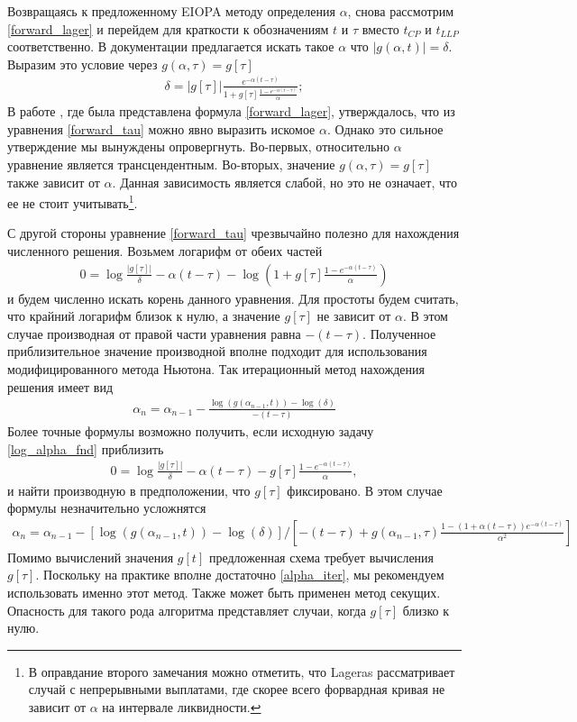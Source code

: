 \documentclass[10pt]{article}
\theoremstyle{definition}
\theoremstyle{remark}
\theoremstyle{plain}
\begin{document}
Возвращаясь к предложенному EIOPA методу определения $\alpha$, снова рассмотрим \eqref{forward_lager} и перейдем для краткости к обозначениям $t$ и $\tau$ вместо $t_{CP}$ и $t_{LLP}$ соответственно.  В документации предлагается искать такое $\alpha$ что $|g(\alpha,t)| = \delta$. Выразим это условие через $g(\alpha,\tau) = g[\tau]$
\begin{align}
\delta = |g[\tau]|\frac{e^{-\alpha(t-\tau)}}{1+g[\tau]\frac{1 - e^{-\alpha(t-\tau)}}{\alpha}}; \label{forward_tau}
\end{align} 
В работе \cite{Lager}, где была представлена формула \eqref{forward_lager}, утверждалось, что из уравнения \eqref{forward_tau} можно явно выразить искомое $\alpha$. Однако это сильное утверждение мы вынуждены опровергнуть. Во-первых, относительно $\alpha$ уравнение является трансцендентным. Во-вторых, значение $g(\alpha,\tau) = g[\tau]$ также зависит от $\alpha$. Данная зависимость является слабой, но это не означает, что ее не стоит учитывать\footnote{В оправдание второго замечания можно отметить, что Lageras рассматривает случай с непрерывными выплатами, где скорее всего форвардная кривая не зависит от $\alpha$ на интервале ликвидности.}. 

С другой стороны уравнение \eqref{forward_tau} чрезвычайно полезно для нахождения численного решения. 
Возьмем логарифм от обеих частей
\begin{align}
0 = \log\frac{|g[\tau]|}{\delta} 
- \alpha(t-\tau) - 
\log\left(1 + g[\tau]\frac{1 - e^{-\alpha(t-\tau)}}{\alpha}\right) \label{log_alpha_fnd}
\end{align}
и будем численно искать корень данного уравнения. Для простоты будем считать, что крайний логарифм близок к нулю, а значение $g[\tau]$ не зависит от $\alpha$. В этом случае производная от правой части уравнения равна $-(t-\tau)$. Полученное приблизительное значение производной вполне подходит для использования модифицированного метода Ньютона. Так итерационный метод нахождения решения имеет вид
\begin{align}
\alpha_n = \alpha_{n-1} - \frac{\log(g(\alpha_{n-1},t)) - \log(\delta)}{-(t-\tau)}\label{alpha_iter}
\end{align}
Более точные формулы возможно получить, если исходную задачу \eqref{log_alpha_fnd} приблизить
\begin{align*}
0 = \log\frac{|g[\tau]|}{\delta} 
- \alpha(t-\tau) - g[\tau]\frac{1 - e^{-\alpha(t-\tau)}}{\alpha},
\end{align*}
и найти производную в предположении, что $g[\tau]$ фиксировано. В этом случае формулы незначительно усложнятся
\begin{align*}
\alpha_n = \alpha_{n-1} - \left[\log(g(\alpha_{n-1},t)) - 
\log(\delta)\right]	\big/
\left[-(t-\tau) + g(\alpha_{n-1},\tau)\frac{1-(1+\alpha(t-\tau))e^{-\alpha(t-\tau)}}{\alpha^2}\right]
\end{align*}
Помимо вычислений значения $g[t]$ предложенная схема требует вычисления $g[\tau]$. Поскольку на практике вполне достаточно \eqref{alpha_iter}, мы рекомендуем использовать именно этот метод. Также может быть применен метод секущих. Опасность для такого рода алгоритма представляет случаи, когда $g[\tau]$ близко к нулю. 
\end{document}
